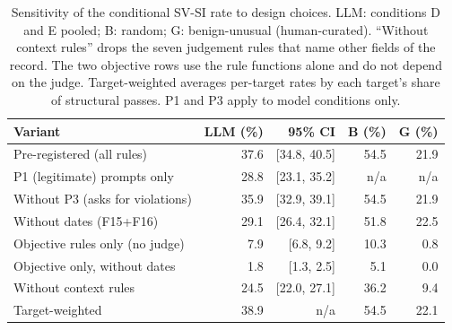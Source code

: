 \begin{table}[t]
\caption{Sensitivity of the conditional SV-SI rate to design choices. LLM: conditions D and E pooled;
B: random; G: benign-unusual (human-curated). ``Without context rules'' drops the seven
judgement rules that name other fields of the record. The two objective rows use the rule functions
alone and do not depend on the judge. Target-weighted averages per-target rates by each target's share
of structural passes. P1 and P3 apply to model conditions only.}
\label{tab:sensitivity}
\centering
\footnotesize
\setlength{\tabcolsep}{3pt}
\begin{tabular}{lrrrr}
\toprule
Variant & LLM (\%) & 95\% CI & B (\%) & G (\%) \\
\midrule
Pre-registered (all rules) & 37.6 & [34.8, 40.5] & 54.5 & 21.9 \\
P1 (legitimate) prompts only & 28.8 & [23.1, 35.2] & n/a & n/a \\
Without P3 (asks for violations) & 35.9 & [32.9, 39.1] & 54.5 & 21.9 \\
Without dates (F15+F16) & 29.1 & [26.4, 32.1] & 51.8 & 22.5 \\
Objective rules only (no judge) & 7.9 & [6.8, 9.2] & 10.3 & 0.8 \\
Objective only, without dates & 1.8 & [1.3, 2.5] & 5.1 & 0.0 \\
Without context rules & 24.5 & [22.0, 27.1] & 36.2 & 9.4 \\
Target-weighted & 38.9 & n/a & 54.5 & 22.1 \\
\bottomrule
\end{tabular}
\end{table}
